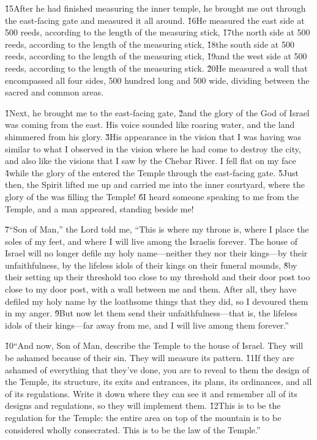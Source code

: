 \v{15}After he had finished measuring the inner temple, he brought me out through the east-facing gate and measured it all around. \v{16}He measured the east side at 500 reeds, according to the length of the measuring stick, \v{17}the north side at 500 reeds, according to the length of the measuring stick, \v{18}the south side at 500 reeds, according to the length of the measuring stick, \v{19}and the west side at 500 reeds, according to the length of the measuring stick. \v{20}He measured a wall that encompassed all four sides, 500 hundred long and 500 wide, dividing between the sacred and common areas.

\v{1}Next, he brought me to the east-facing gate, \v{2}and the glory of the God of Israel was coming from the east. His voice sounded like roaring water, and the land shimmered from his glory. \v{3}His appearance in the vision that I was having was similar to what I observed in the vision where he had come to destroy the city, and also like the visions that I saw by the Chebar River. I fell flat on my face \v{4}while the glory of the  entered the Temple through the east-facing gate. \v{5}Just then, the Spirit lifted me up and carried me into the inner courtyard, where the glory of the  was filling the Temple! \v{6}I heard someone speaking to me from the Temple, and a man appeared, standing beside me!

\v{7}``Son of Man,'' the Lord  told me, ``This is where my throne is, where I place the soles of my feet, and where I will live among the Israelis forever. The house of Israel will no longer defile my holy name---neither they nor their kings---by their unfaithfulness, by the lifeless idols of their kings on their funeral mounds, \v{8}by their setting up their threshold too close to my threshold and their door post too close to my door post, with a wall between me and them. After all, they have defiled my holy name by the loathsome things that they did, so I devoured them in my anger. \v{9}But now let them send their unfaithfulness---that is, the lifeless idols of their kings---far away from me, and I will live among them forever.''

\v{10}``And now, Son of Man, describe the Temple to the house of Israel. They will be ashamed because of their sin. They will measure its pattern. \v{11}If they are ashamed of everything that they've done, you are to reveal to them the design of the Temple, its structure, its exits and entrances, its plans, its ordinances, and all of its regulations. Write it down where they can see it and remember all of its designs and regulations, so they will implement them. \v{12}This is to be the regulation for the Temple: the entire area on top of the mountain is to be considered wholly consecrated. This is to be the law of the Temple.''

